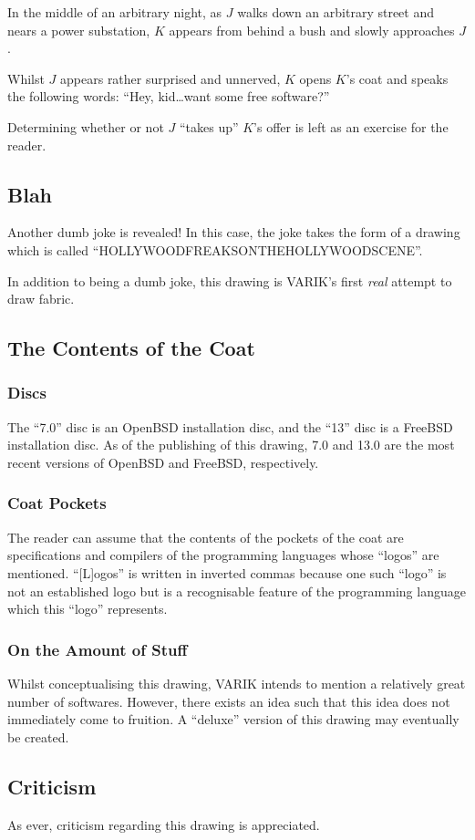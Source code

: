 \documentclass{report}
\begin{document}
In the middle of an arbitrary night, as $J$ walks down an arbitrary street and nears a power substation, $K$ appears from behind a bush and slowly approaches $J$.

Whilst $J$ appears rather surprised and unnerved, $K$ opens $K$'s coat and speaks the following words: ``Hey, kid\ldots want some free software?''

Determining whether or not $J$ ``takes up'' $K$'s offer is left as an exercise for the reader.
\subsection{Blah}
Another dumb joke is revealed!  In this case, the joke takes the form of a drawing which is called ``HOLLYWOODFREAKSONTHEHOLLYWOODSCENE''.

In addition to being a dumb joke, this drawing is VARIK's first \textit{real} attempt to draw fabric.
\subsection{The Contents of the Coat}
\subsubsection{Discs}
The ``7.0'' disc is an OpenBSD installation disc, and the ``13'' disc is a FreeBSD installation disc.  As of the publishing of this drawing, 7.0 and 13.0 are the most recent versions of OpenBSD and FreeBSD, respectively.
\subsubsection{Coat Pockets}
The reader can assume that the contents of the pockets of the coat are specifications and compilers of the programming languages whose ``logos'' are mentioned.  ``[L]ogos'' is written in inverted commas because one such ``logo'' is not an established logo but is a recognisable feature of the programming language which this ``logo'' represents.
\subsubsection{On the Amount of Stuff}
Whilst conceptualising this drawing, VARIK intends to mention a relatively great number of softwares.  However, there exists an idea such that this idea does not immediately come to fruition.  A ``deluxe'' version of this drawing may eventually be created.
\subsection{Criticism}
As ever, criticism regarding this drawing is appreciated.
\end{document}

